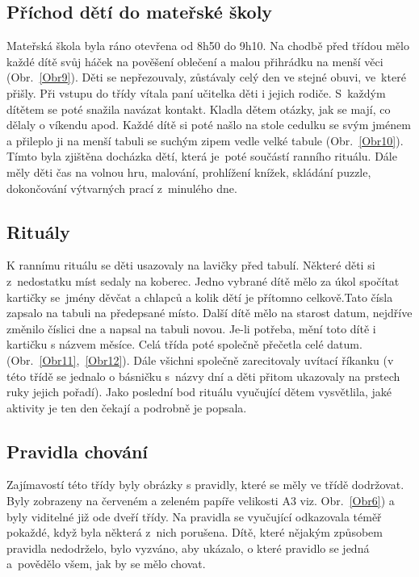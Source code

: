 		\subsection{Příchod dětí do mateřské školy}
		\label{prichod}
			Mateřská škola byla ráno otevřena od 8h50 do 9h10. Na chodbě před třídou mělo každé dítě svůj háček na pověšení oblečení a malou přihrádku na menší věci (Obr.~\ref{Obr9}). Děti se nepřezouvaly, zůstávaly celý den ve stejné obuvi, ve které přišly. Při vstupu do třídy vítala paní učitelka děti i jejich rodiče. S každým dítětem se poté snažila navázat kontakt. Kladla dětem otázky, jak se mají, co dělaly o víkendu apod. Každé dítě si poté našlo na stole cedulku se svým jménem a přileplo ji na menší tabuli se suchým zipem vedle velké tabule (Obr.~\ref{Obr10}). Tímto byla zjištěna docházka dětí, která je poté součástí ranního rituálu. Dále měly děti čas na volnou hru, malování, prohlížení knížek, skládání puzzle, dokončování výtvarných prací z minulého dne.
		
		\subsection{Rituály}
		\label{ritualy}
			K rannímu rituálu se děti usazovaly na lavičky před tabulí. Některé děti si z nedostatku míst sedaly na koberec. Jedno vybrané dítě mělo za úkol spočítat kartičky se jmény děvčat a chlapců a kolik dětí je přítomno celkově.Tato čísla zapsalo na tabuli na předepsané místo. Další dítě mělo na starost datum, nejdříve změnilo číslici dne a napsal na tabuli novou. Je-li potřeba, mění toto dítě i kartičku s názvem měsíce. Celá třída poté společně přečetla celé datum. (Obr.~\ref{Obr11},~\ref{Obr12}). Dále všichni společně zarecitovaly uvítací říkanku (v této třídě se jednalo o básničku s názvy dní a děti přitom ukazovaly na prstech ruky jejich pořadí). Jako poslední bod rituálu vyučující dětem vysvětlila, jaké aktivity je ten den čekají a podrobně je popsala. 

		\subsection{Pravidla chování}
		\label{pravidlaChovani}
			Zajímavostí této třídy byly obrázky s pravidly, které se měly ve třídě dodržovat. Byly zobrazeny na červeném a zeleném papíře velikosti A3 viz. Obr.~\ref{Obr6}) a byly viditelné již ode dveří třídy. Na pravidla se vyučující odkazovala téměř pokaždé, když byla některá z nich porušena. Dítě, které nějakým způsobem pravidla nedodrželo, bylo vyzváno, aby ukázalo, o které pravidlo se jedná a povědělo všem, jak by se mělo chovat. 

